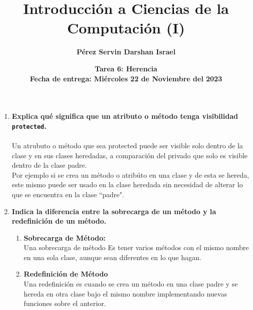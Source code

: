 \documentclass{article} %
\title{\textbf{Introducci\'on a Ciencias de la Computaci\'on (I)}}
\author{\textbf{P\'erez Servin Darshan Israel}}
\date{\textbf{Tarea 6: Herencia\\ Fecha de entrega: Mi\'ercoles 22 de Noviembre del 2023}} %
\begin{document}
\maketitle %

\begin{enumerate}
\item \textbf{Explica qué significa que un atributo o método tenga visibilidad \texttt{protected}.}\\\\
    Un atrubuto o método que sea protected puede ser visible solo dentro de la clase
    y en sus clases heredadas, a comparación del privado que solo  es visible dentro 
    de la clase padre.\\
    Por ejemplo si se crea un método o atribúto en una clase y de esta se hereda, este
    mismo puede ser usado en la clase heredada sin necesidad de alterar lo que se encuentra
    en la clase ``padre".
\item \textbf{Indica la diferencia entre la sobrecarga de un método y la redefinición de un método.}
    \begin{enumerate}[label={}]
        \item \textbf{Sobrecarga de Método:}\\
        Una sobrecarga de método Es tener varios métodos con el mismo nombre en una sola clase, 
        aunque sean diferentes en lo que hagan.
        \item \textbf{Redefinición de Método}\\
        Una redefinición es cuando se crea un método en una clase padre y se hereda en otra clase
        bajo el mismo nombre implementando nuevas funciones sobre el anterior.
    \end{enumerate}


\end{enumerate}
\end{document}
